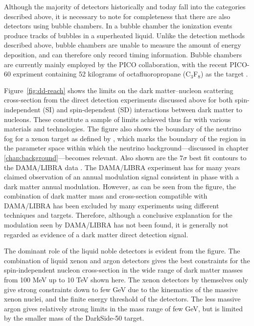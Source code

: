 \documentclass[b5paper, 10pt, twoside]{book}
\begin{document}
Although the majority of detectors historically and today fall into the categories described above, it is necessary to note for completeness that there are also detectors using bubble chambers. In a bubble chamber the ionization events produce tracks of bubbles in a superheated liquid. Unlike the detection methods described above, bubble chambers are unable to measure the amount of energy deposition, and can therefore only record timing information. Bubble chambers are currently mainly employed by the PICO collaboration, with the recent PICO-60 expriment containing 52 kilograms of octafluoropropane (C$_3$F$_8$) as the target \parencite{PICO602019}.

Figure~\ref{fig:dd-reach} shows the limits on the dark matter--nucleon scattering cross-section from the direct detection experiments discussed above for both spin-independent (SI) and spin-dependent (SD) interactions between dark matter to nucleons. These constitute a sample of limits achieved thus far with various materials and technologies. The figure also shows the boundary of the neutrino fog for a xenon target as defined by \textcite{OHare2021}, which marks the boundary of the region in the parameter space within which the neutrino background---discussed in chapter \ref{chap:background}---becomes relevant. Also shown are the $7\sigma$ best fit contours to the DAMA/LIBRA data \parencite{SavageEtAl2009}. The DAMA/LIBRA experiment has for many years claimed observation of an annual modulation signal consistent in phase with a dark matter annual modulation. However, as can be seen from the figure, the combination of dark matter mass and cross-section compatible with DAMA/LIBRA has been excluded by many experiments using different techniques and targets. Therefore, although a conclusive explanation for the modulation seen by DAMA/LIBRA has not been found, it is generally not regarded as evidence of a dark matter direct detection signal.

The dominant role of the liquid noble detectors is evident from the figure. The combination of liquid xenon and argon detectors gives the best constraints for the spin-independent nucleon cross-section in the wide range of dark matter masses from 100 MeV up to 10 TeV shown here. The xenon detectors by themselves only give strong constraints down to few GeV due to the kinematics of the massive xenon nuclei, and the finite energy threshold of the detectors. The less massive argon gives relatively strong limits in the mass range of few GeV, but is limited by the smaller mass of the DarkSide-50 target.
\end{document}
